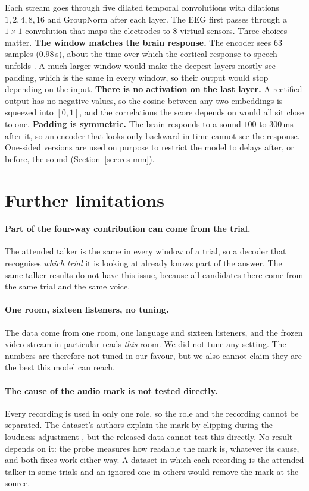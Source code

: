 Each stream goes through five dilated temporal convolutions
\citep{yu2016dilated} with dilations $1,2,4,8,16$ and GroupNorm
\citep{wu2018groupnorm} after each layer. The EEG first passes through a
$1{\times}1$ convolution that maps the electrodes to $8$ virtual sensors. Three
choices matter. \textbf{The window matches the brain response.} The encoder sees
$63$ samples ($0.98$\,s), about the time over which the cortical response to
speech unfolds \citep{lalor2009}. A much larger window would make the deepest
layers mostly see padding, which is the same in every window, so their output
would stop depending on the input. \textbf{There is no activation on the last
layer.} A rectified output has no negative values, so the cosine between any two
embeddings is squeezed into $[0,1]$, and the correlations the score depends on
would all sit close to one. \textbf{Padding is symmetric.} The brain responds to a
sound $100$ to $300$\,ms after it, so an encoder that looks only backward in time
cannot see the response. One-sided versions are used on purpose to restrict the
model to delays after, or before, the sound (Section~\ref{sec:res-mm}).

\section{Further limitations}
\label{app:limits}

\paragraph{Part of the four-way contribution can come from the trial.}
The attended talker is the same in every window of a trial, so a decoder that
recognises \emph{which trial} it is looking at already knows part of the answer.
The same-talker results do not have this issue, because all candidates there come
from the same trial and the same voice.

\paragraph{One room, sixteen listeners, no tuning.}
The data come from one room, one language and sixteen listeners, and the frozen
video stream in particular reads \emph{this} room. We did not tune any setting.
The numbers are therefore not tuned in our favour, but we also cannot claim they
are the best this model can reach.

\paragraph{The cause of the audio mark is not tested directly.}
Every recording is used in only one role, so the role and the recording cannot be
separated. The dataset's authors explain the mark by clipping during the loudness
adjustment \citep{maestro2026}, but the released data cannot test this directly.
No result depends on it: the probe measures how readable the mark is, whatever
its cause, and both fixes work either way. A dataset in which each recording is
the attended talker in some trials and an ignored one in others would remove the
mark at the source.

